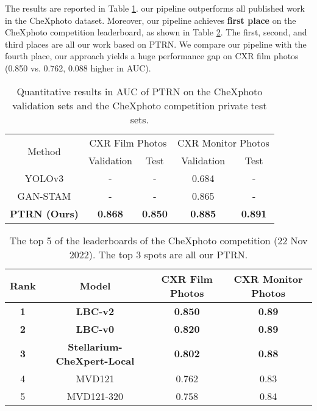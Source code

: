 \documentclass[preprint, 12pt]{elsarticle}
\begin{document}
The results are reported in Table \ref{tab:chexphoto}. our pipeline outperforms all published work \cite{le2020interpretation,chong2021gan} in the CheXphoto dataset. Moreover, our pipeline achieves \textbf{first place} on the CheXphoto competition leaderboard, as shown in Table \ref{tab:competition}. The first, second, and third places are all our work based on PTRN. We compare our pipeline with the fourth place, our approach yields a huge performance gap on CXR film photos (0.850 vs. 0.762, 0.088 higher in AUC).

\begin{table}
    \centering
    \footnotesize
    \begin{tabular}{c||cc|cc}
        \hline
        \multirow{2}{4em}{Method} & \multicolumn{2}{c|}{CXR Film Photos} & \multicolumn{2}{c}{CXR Monitor Photos} \\
        \cline{2-5}
        & Validation & Test & Validation & Test \\
        \hline

        YOLOv3 \cite{le2020interpretation} & - & - & 0.684 & - \\
        GAN-STAM \cite{chong2021gan} & - & - & 0.865 & - \\
        \textbf{PTRN (Ours)} & \textbf{0.868} & \textbf{0.850} & \textbf{0.885} & \textbf{0.891} \\
        \hline
    \end{tabular}
    \caption{Quantitative results in AUC of PTRN on the CheXphoto validation sets and the CheXphoto competition private test sets.}
    \label{tab:chexphoto}
\end{table}

\begin{table}
    \centering
    \footnotesize
    \begin{tabular}{cccc}
        \hline
        Rank & Model & CXR Film Photos & CXR Monitor Photos \\
        \hline
        \textbf{1} & \textbf{LBC-v2} & \textbf{0.850} & \textbf{0.89} \\
        \textbf{2} & \textbf{LBC-v0} & \textbf{0.820} & \textbf{0.89} \\
        \textbf{3} & \textbf{Stellarium-CheXpert-Local} & \textbf{0.802} & \textbf{0.88} \\
        4 & MVD121 & 0.762 & 0.83 \\
        5 & MVD121-320 & 0.758 & 0.84 \\
        \hline
    \end{tabular}
    \caption{The top 5 of the leaderboards of the CheXphoto competition (22 Nov 2022). The top 3 spots are all our PTRN.}
    \label{tab:competition}
\end{table}
\end{document}
